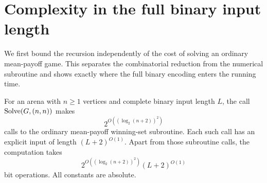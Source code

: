 \section{Complexity in the full binary input length}
\label{sec:complexity}

We first bound the recursion independently of the cost of solving an
ordinary mean-payoff game.  This separates the combinatorial reduction
from the numerical subroutine and shows exactly where the full binary
encoding enters the running time.

\begin{proposition}
\label{prop:reduction-cost}
For an arena with $n\ge1$ vertices and complete binary input length $L$,
the call $\operatorname{Solve}(G,(n,n))$ makes
\[
 2^{O((\log_2(n+2))^2)}
\]
calls to the ordinary mean-payoff winning-set subroutine.  Each such
call has an explicit input of length $(L+2)^{O(1)}$.  Apart from those
subroutine calls, the computation takes
\[
 2^{O((\log_2(n+2))^2)}(L+2)^{O(1)}
\]
bit operations.  All constants are absolute.
\end{proposition}

